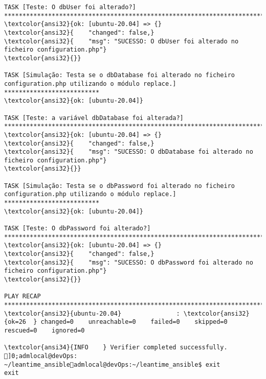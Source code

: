 \documentclass{scrartcl}
\begin{document}
\begin{Verbatim}
TASK [Teste: O dbUser foi alterado?] *****************************************************************************************************
\textcolor{ansi32}{ok: [ubuntu-20.04] => {}
\textcolor{ansi32}{    "changed": false,}
\textcolor{ansi32}{    "msg": "SUCESSO: O dbUser foi alterado no ficheiro configuration.php"}
\textcolor{ansi32}{}}

TASK [Simulação: Testa se o dbDatabase foi alterado no ficheiro configuration.php utilizando o módulo replace.] **************************
\textcolor{ansi32}{ok: [ubuntu-20.04]}

TASK [Teste: a variável dbDatabase foi alterada?] ****************************************************************************************
\textcolor{ansi32}{ok: [ubuntu-20.04] => {}
\textcolor{ansi32}{    "changed": false,}
\textcolor{ansi32}{    "msg": "SUCESSO: O dbDatabase foi alterado no ficheiro configuration.php"}
\textcolor{ansi32}{}}

TASK [Simulação: Testa se o dbPassword foi alterado no ficheiro configuration.php utilizando o módulo replace.] **************************
\textcolor{ansi32}{ok: [ubuntu-20.04]}

TASK [Teste: O dbPassword foi alterado?] *************************************************************************************************
\textcolor{ansi32}{ok: [ubuntu-20.04] => {}
\textcolor{ansi32}{    "changed": false,}
\textcolor{ansi32}{    "msg": "SUCESSO: O dbPassword foi alterado no ficheiro configuration.php"}
\textcolor{ansi32}{}}

PLAY RECAP *******************************************************************************************************************************
\textcolor{ansi32}{ubuntu-20.04}               : \textcolor{ansi32}{ok=26  } changed=0    unreachable=0    failed=0    skipped=0    rescued=0    ignored=0

\textcolor{ansi34}{INFO    } Verifier completed successfully.
]0;admlocal@devOps: ~/leantime_ansibleadmlocal@devOps:~/leantime_ansible$ exit
exit

\end{Verbatim}
\end{document}
